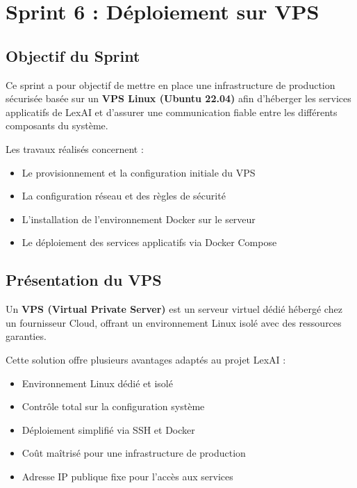 \section{Sprint 6 : Déploiement sur VPS}

\subsection{Objectif du Sprint}

Ce sprint a pour objectif de mettre en place une infrastructure de production sécurisée basée sur un \textbf{VPS Linux (Ubuntu 22.04)} afin d’héberger les services applicatifs de LexAI et d’assurer une communication fiable entre les différents composants du système.

Les travaux réalisés concernent :

\begin{itemize}[label=--]
    \item Le provisionnement et la configuration initiale du VPS
    \item La configuration réseau et des règles de sécurité
    \item L’installation de l’environnement Docker sur le serveur
    \item Le déploiement des services applicatifs via Docker Compose
\end{itemize}

\subsection{Présentation du VPS}

Un \textbf{VPS (Virtual Private Server)} est un serveur virtuel dédié hébergé chez un fournisseur Cloud, offrant un environnement Linux isolé avec des ressources garanties.

Cette solution offre plusieurs avantages adaptés au projet LexAI :

\begin{itemize}[label=--]
    \item Environnement Linux dédié et isolé
    \item Contrôle total sur la configuration système
    \item Déploiement simplifié via SSH et Docker
    \item Coût maîtrisé pour une infrastructure de production
    \item Adresse IP publique fixe pour l’accès aux services
\end{itemize}

